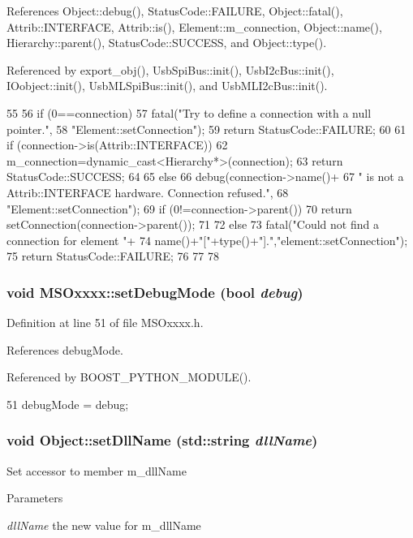 References Object::debug(), StatusCode::FAILURE, Object::fatal(), Attrib::INTERFACE, Attrib::is(), Element::m\_\-connection, Object::name(), Hierarchy::parent(), StatusCode::SUCCESS, and Object::type().

Referenced by export\_\-obj(), UsbSpiBus::init(), UsbI2cBus::init(), IOobject::init(), UsbMLSpiBus::init(), and UsbMLI2cBus::init().


\begin{DoxyCode}
55                                                       {
56   if (0==connection){
57     fatal("Try to define a connection with a null pointer.",
58         "Element::setConnection");
59     return StatusCode::FAILURE;
60   }
61   if (connection->is(Attrib::INTERFACE)){
62     m_connection=dynamic_cast<Hierarchy*>(connection);
63     return StatusCode::SUCCESS;
64   }
65   else {
66     debug(connection->name()+
67         " is not a Attrib::INTERFACE hardware. Connection refused.",
68         "Element::setConnection");
69     if (0!=connection->parent()){
70       return setConnection(connection->parent());
71     }
72     else{
73       fatal("Could not find a connection for element "+
74           name()+"["+type()+"].","element::setConnection");
75       return StatusCode::FAILURE;
76     }
77   }
78 }
\end{DoxyCode}
\hypertarget{classMSOxxxx_a59a1d5e5f537086590b60a93d5c4c8a1}{
\subsubsection[{setDebugMode}]{\setlength{\rightskip}{0pt plus 5cm}void MSOxxxx::setDebugMode (bool {\em debug})}}
\label{classMSOxxxx_a59a1d5e5f537086590b60a93d5c4c8a1}


Definition at line 51 of file MSOxxxx.h.

References debugMode.

Referenced by BOOST\_\-PYTHON\_\-MODULE().


\begin{DoxyCode}
51 {       debugMode = debug;      }
\end{DoxyCode}
\hypertarget{classObject_a870c5af919958c2136623b2d7816d123}{
\subsubsection[{setDllName}]{\setlength{\rightskip}{0pt plus 5cm}void Object::setDllName (std::string {\em dllName})}}
\label{classObject_a870c5af919958c2136623b2d7816d123}
Set accessor to member m\_\-dllName 
\begin{DoxyParams}{Parameters}
\item[{\em dllName}]the new value for m\_\-dllName \end{DoxyParams}


